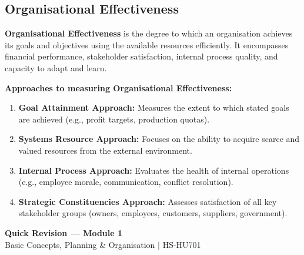 \documentclass[12pt,a4paper]{article}
\begin{document}
\subsection{Organisational Effectiveness}

\begin{tcolorbox}[defbox, title={\textbf{Organisational Effectiveness}}]
\textbf{Organisational Effectiveness} is the degree to which an organisation achieves its goals and objectives using the available resources efficiently. It encompasses financial performance, stakeholder satisfaction, internal process quality, and capacity to adapt and learn.
\end{tcolorbox}

\textbf{Approaches to measuring Organisational Effectiveness:}
\begin{enumerate}[label=\textbf{\arabic*.}, leftmargin=*, itemsep=3pt, topsep=2pt]
  \item \textbf{Goal Attainment Approach:} Measures the extent to which stated goals are achieved (e.g., profit targets, production quotas).
  \item \textbf{Systems Resource Approach:} Focuses on the ability to acquire scarce and valued resources from the external environment.
  \item \textbf{Internal Process Approach:} Evaluates the health of internal operations (e.g., employee morale, communication, conflict resolution).
  \item \textbf{Strategic Constituencies Approach:} Assesses satisfaction of all key stakeholder groups (owners, employees, customers, suppliers, government).
\end{enumerate}

\newpage
\begin{center}
  {\large\bfseries\color{myred} Quick Revision --- Module 1}\\[3pt]
  {\small\color{mydark} Basic Concepts, Planning \& Organisation $|$ HS-HU701}
\end{center}
\noindent{\color{myred}\rule{\linewidth}{1.2pt}}
\vspace{4pt}
\end{document}
